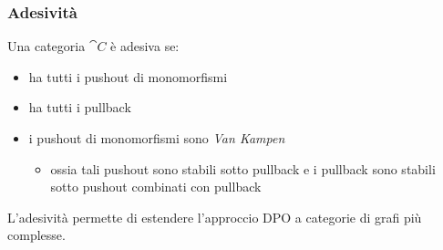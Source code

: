 \documentclass[8pt]{beamer}
\begin{document}
\begin{frame}[fragile]\frametitle{Adesivit\`a}


	\iffalse
	\begin{wrapfigure}{l}{0.4\textwidth}
                \[
                \begin{tikzcd}[row sep=11, column sep=11]
                        & {A'} && {B'} \\
                        {C'} && {D'} \\
                        & A && B \\
                        C && D
                        \arrow["{f'}", from=1-2, to=1-4]
                        \arrow["{m'}"', from=1-2, to=2-1]
                        \arrow["a"'{pos=0.7}, from=1-2, to=3-2]
                        \arrow["{n'}"', from=1-4, to=2-3]
                        \arrow["b", from=1-4, to=3-4]
                        \arrow["{g'}"{pos=0.7}, from=2-1, to=2-3, crossing over]
                        \arrow["c"', from=2-1, to=4-1]
                        \arrow["f"'{pos=0.3}, from=3-2, to=3-4]
                        \arrow["d"{pos=0.3}, from=2-3, to=4-3, crossing over]
                        \arrow["m", from=3-2, to=4-1]
                        \arrow["n", from=3-4, to=4-3]
                        \arrow["g"', from=4-1, to=4-3]
                    \end{tikzcd}
            \]
        \end{wrapfigure}
	\fi

	Una categoria $\cat C$ \`e adesiva se:
	\begin{itemize}
		\item ha tutti i pushout di monomorfismi
		\item ha tutti i pullback
		\item i pushout di monomorfismi sono \emph{Van Kampen}
			\begin{itemize}
				\item ossia tali pushout sono stabili sotto pullback e i pullback sono stabili sotto pushout combinati con pullback
			\end{itemize}
	\end{itemize}

	\smallskip

	L'adesivit\`a permette di estendere l'approccio DPO a categorie di grafi pi\`u complesse.

	\smallskip
	
	\smallskip
\begin{figure}%
    \centering
    \qquad
    \label{fig:example}%
\end{figure}

\end{frame}
\end{document}
